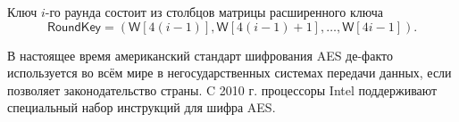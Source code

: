 Ключ $i$-го раунда состоит из столбцов матрицы расширенного ключа
\[
    \mathsf{RoundKey} = (\mathsf{W}[4(i-1)], \mathsf{W}[4(i-1) + 1], \ldots, \mathsf{W}[4i-1]).
\]

В настоящее время американский стандарт шифрования AES де-факто используется во всём мире в негосударственных системах передачи данных, если позволяет законодательство страны. C 2010 г. процессоры Intel поддерживают специальный набор инструкций для шифра AES.

